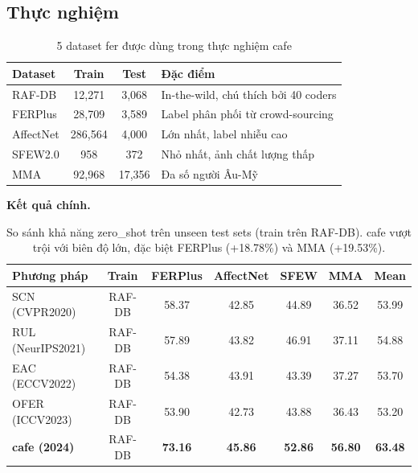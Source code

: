 \documentclass[12pt,a4paper]{article}
\let\oldtextbf\textbf
\renewcommand{\textbf}[1]{\oldtextbf{\textcolor{hcmublue}{#1}}}
\begin{document}
\subsection{Thực nghiệm}

\begin{table}[H]
\centering
\small
\begin{tabular}{|l|c|c|l|}
\hline
\textbf{Dataset} & \textbf{Train} & \textbf{Test} & \textbf{Đặc điểm} \\ \hline
RAF-DB       & 12,271  & 3,068  & In-the-wild, chú thích bởi 40 coders \\ \hline
FERPlus      & 28,709  & 3,589  & Label phân phối từ crowd-sourcing \\ \hline
AffectNet    & 286,564 & 4,000  & Lớn nhất, label nhiễu cao \\ \hline
SFEW2.0      & 958     & 372    & Nhỏ nhất, ảnh chất lượng thấp \\ \hline
MMA          & 92,968  & 17,356 & Đa số người Âu-Mỹ \\ \hline
\end{tabular}
\caption{5 dataset \gls{fer} được dùng trong thực nghiệm \gls{cafe}}
\label{tab:datasets}
\end{table}

\textbf{Kết quả chính.}

\begin{table}[H]
\centering
\small
\begin{tabular}{|l|c|c|c|c|c|c|}
\hline
\textbf{Phương pháp} & \textbf{Train} & \textbf{FERPlus} & \textbf{AffectNet} & \textbf{SFEW} & \textbf{MMA} & \textbf{Mean} \\ \hline
SCN (CVPR2020)    & RAF-DB & 58.37 & 42.85 & 44.89 & 36.52 & 53.99 \\
RUL (NeurIPS2021) & RAF-DB & 57.89 & 43.82 & 46.91 & 37.11 & 54.88 \\
EAC (ECCV2022)    & RAF-DB & 54.38 & 43.91 & 43.39 & 37.27 & 53.70 \\
OFER (ICCV2023)   & RAF-DB & 53.90 & 42.73 & 43.88 & 36.43 & 53.20 \\
\textbf{\gls{cafe} (2024)} & RAF-DB & \textbf{73.16} & \textbf{45.86} & \textbf{52.86} & \textbf{56.80} & \textbf{63.48} \\ \hline
\end{tabular}
\caption{So sánh khả năng \gls{zero_shot} trên unseen test sets (train trên RAF-DB). \gls{cafe} vượt trội với biên độ lớn, đặc biệt FERPlus (+18.78\%) và MMA (+19.53\%).}
\label{tab:main_results}
\end{table}
\end{document}
